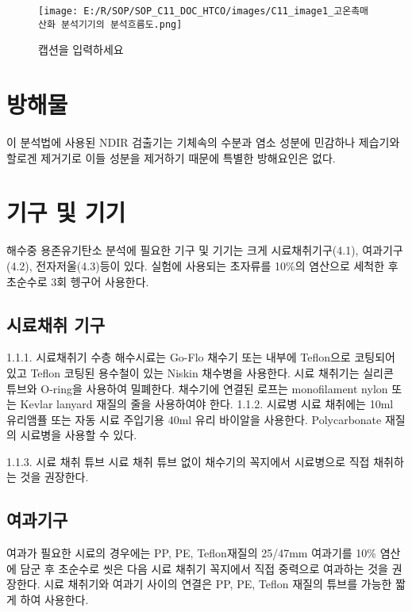 \documentclass[
]{book}
\begin{document}
\begin{figure}
\centering
\texttt{[image: E:/R/SOP/SOP\_C11\_DOC\_HTCO/images/C11\_image1\_고온촉매 산화 분석기기의 분석흐름도.png]}
\caption{캡션을 입력하세요}
\end{figure}

\hypertarget{uxbc29uxd574uxbb3c-5}{%
\section{방해물}\label{uxbc29uxd574uxbb3c-5}}

이 분석법에 사용된 NDIR 검출기는 기체속의 수분과 염소 성분에 민감하나 제습기와 할로겐 제거기로 이들 성분을 제거하기 때문에 특별한 방해요인은 없다.

\hypertarget{uxae30uxad6c-uxbc0f-uxae30uxae30-5}{%
\section{기구 및 기기}\label{uxae30uxad6c-uxbc0f-uxae30uxae30-5}}

해수중 용존유기탄소 분석에 필요한 기구 및 기기는 크게 시료채취기구(4.1), 여과기구(4.2), 전자저울(4.3)등이 있다. 실험에 사용되는 초자류를 10\%의 염산으로 세척한 후 초순수로 3회 헹구어 사용한다.

\hypertarget{uxc2dcuxb8ccuxcc44uxcde8-uxae30uxad6c-1}{%
\subsection{시료채취 기구}\label{uxc2dcuxb8ccuxcc44uxcde8-uxae30uxad6c-1}}

1.1.1. 시료채취기
수층 해수시료는 Go-Flo 채수기 또는 내부에 Teflon으로 코팅되어 있고 Teflon 코팅된 용수철이 있는 Niskin 채수병을 사용한다. 시료 채취기는 실리콘 튜브와 O-ring을 사용하여 밀폐한다. 채수기에 연결된 로프는 monofilament nylon 또는 Kevlar lanyard 재질의 줄을 사용하여야 한다.
1.1.2. 시료병
시료 채취에는 10ml 유리앰퓰 또는 자동 시료 주입기용 40ml 유리 바이알을 사용한다. Polycarbonate 재질의 시료병을 사용할 수 있다.

1.1.3. 시료 채취 튜브
시료 채취 튜브 없이 채수기의 꼭지에서 시료병으로 직접 채취하는 것을 권장한다.

\hypertarget{uxc5ecuxacfcuxae30uxad6c}{%
\subsection{여과기구}\label{uxc5ecuxacfcuxae30uxad6c}}

여과가 필요한 시료의 경우에는 PP, PE, Teflon재질의 25/47mm 여과기를 10\% 염산에 담군 후 초순수로 씻은 다음 시료 채취기 꼭지에서 직접 중력으로 여과하는 것을 권장한다. 시료 채취기와 여과기 사이의 연결은 PP, PE, Teflon 재질의 튜브를 가능한 짧게 하여 사용한다.
\end{document}
